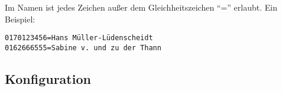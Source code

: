 Im Namen ist jedes Zeichen außer dem Gleichheitszeichen ``='' erlaubt. Ein
Beispiel:

\begin{small}
\begin{example}
\begin{verbatim}
0170123456=Hans Müller-Lüdenscheidt
0162666555=Sabine v. und zu der Thann
\end{verbatim}
\end{example}
\end{small}


\subsection {Konfiguration}

